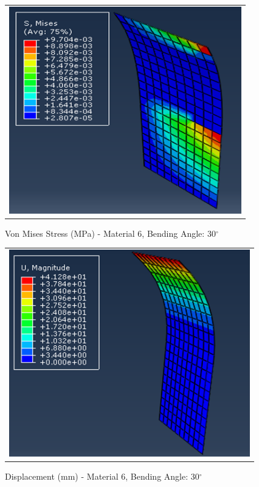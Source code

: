 \documentclass[a4paper,12pt]{article}
\numberwithin{equation}{section}
\numberwithin{figure}{section}
\begin{document}
\begin{figure}[H]
  \centering
  \begin{tabular}{@{}c@{}}
    \includegraphics[width=0.7\linewidth,height=255pt]{Results/Bending/M6_VMS_30_new.png} \\
  \end{tabular}
  \caption{Von Mises Stress (MPa) - Material 6,  Bending Angle: 30$^{\circ}$ }
\end{figure}

\begin{figure}[H]
  \centering
  \begin{tabular}{@{}c@{}}
    \includegraphics[width=0.7\linewidth,height=255pt]{Results/Bending/M6_DIS_30_new.png} \\
  \end{tabular}
  \caption{Displacement (mm) - Material 6, Bending Angle: 30$^{\circ}$ }
\end{figure}
\end{document}
